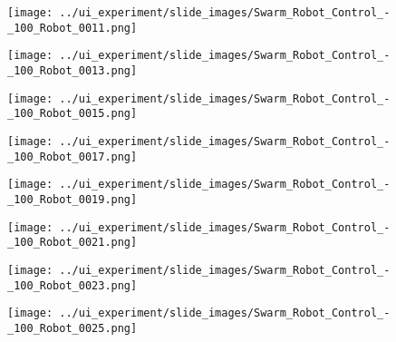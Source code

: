 \begin{minipage}{\linewidth}
	\centering
	\begin{minipage}{0.42\linewidth}
		\texttt{[image: ../ui\_experiment/slide\_images/Swarm\_Robot\_Control\_-\_100\_Robot\_0011.png]}
		\label{fig:sub1}
	\end{minipage}
	\hspace{0.05\linewidth}
	\begin{minipage}{0.42\linewidth}
		\texttt{[image: ../ui\_experiment/slide\_images/Swarm\_Robot\_Control\_-\_100\_Robot\_0013.png]}
		\label{fig:sub2}
	\end{minipage}
\end{minipage}

\begin{minipage}{\linewidth}
	\centering
	\begin{minipage}{0.42\linewidth}
		\texttt{[image: ../ui\_experiment/slide\_images/Swarm\_Robot\_Control\_-\_100\_Robot\_0015.png]}
		\label{fig:sub1}
	\end{minipage}
	\hspace{0.05\linewidth}
	\begin{minipage}{0.42\linewidth}
		\texttt{[image: ../ui\_experiment/slide\_images/Swarm\_Robot\_Control\_-\_100\_Robot\_0017.png]}
		\label{fig:sub2}
	\end{minipage}
\end{minipage}

\begin{minipage}{\linewidth}
	\centering
	\begin{minipage}{0.42\linewidth}
		\texttt{[image: ../ui\_experiment/slide\_images/Swarm\_Robot\_Control\_-\_100\_Robot\_0019.png]}
		\label{fig:sub1}
	\end{minipage}
	\hspace{0.05\linewidth}
	\begin{minipage}{0.42\linewidth}
		\texttt{[image: ../ui\_experiment/slide\_images/Swarm\_Robot\_Control\_-\_100\_Robot\_0021.png]}
		\label{fig:sub2}
	\end{minipage}
\end{minipage}

\begin{minipage}{\linewidth}
	\centering
	\begin{minipage}{0.42\linewidth}
		\texttt{[image: ../ui\_experiment/slide\_images/Swarm\_Robot\_Control\_-\_100\_Robot\_0023.png]}
		\label{fig:sub1}
	\end{minipage}
	\hspace{0.05\linewidth}
	\begin{minipage}{0.42\linewidth}
		\texttt{[image: ../ui\_experiment/slide\_images/Swarm\_Robot\_Control\_-\_100\_Robot\_0025.png]}
		\label{fig:sub1}
	\end{minipage}
\end{minipage}

